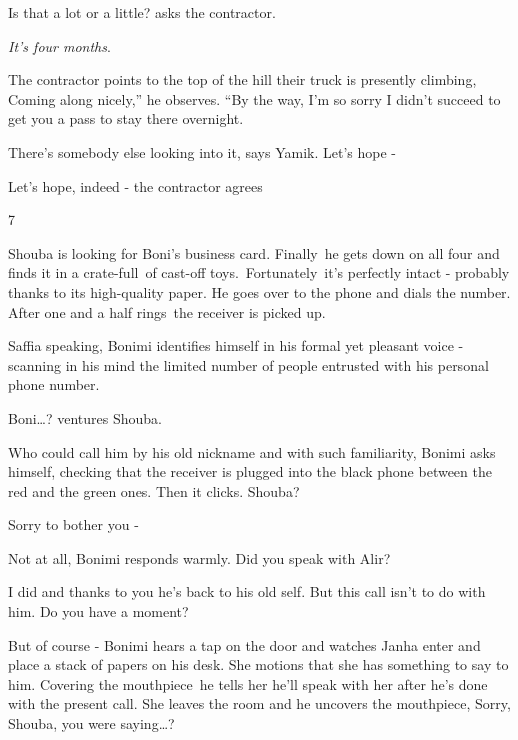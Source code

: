 \documentclass[letterpaper]{article}
\begin{document}
{\textquotedbl}Is that a lot or a little?{\textquotedbl} asks the contractor. 

{\textquotedbl}\textit{It's four months}.{\textquotedbl} 

The contractor points to the top of the hill their truck is presently climbing, {\textquotedbl}Coming along nicely,'' he
observes. ``By the way, I'm so sorry I didn't succeed to get you a pass to stay there overnight.{\textquotedbl} 

{\textquotedbl}There's somebody else looking into it,{\textquotedbl} says Yamik. {\textquotedbl}Let's hope
-{\textquotedbl} 

{\textquotedbl}Let's hope, indeed -{\textquotedbl} the contractor agrees


\bigskip

7\ \ 

Shouba is looking for Boni's business card. Finally\ he gets down on all four and finds it in a crate-full~of cast-off
toys.\ Fortunately\ it's perfectly intact -  probably thanks to its high-quality paper. He goes over to the phone and
dials the number. After one and a half rings~the receiver is picked up.

{\textquotedbl}Saffia speaking,{\textquotedbl} Bonimi identifies himself in his formal yet pleasant voice - scanning in
his mind the limited number of people entrusted with his personal phone number.

{\textquotedbl}Boni{\dots}?{\textquotedbl} ventures Shouba. 

Who could call him by his old nickname and with such familiarity, Bonimi asks himself, checking that the receiver is
plugged into the black phone between the red and the green ones. Then it clicks. {\textquotedbl}Shouba?{\textquotedbl} 

{\textquotedbl}Sorry to bother you -{\textquotedbl}\ 

{\textquotedbl}Not at all,{\textquotedbl} Bonimi responds warmly. {\textquotedbl}Did you speak with Alir?{\textquotedbl}

{\textquotedbl}I did and thanks to you he's back to his old self. But this call isn't to do with him. Do you have a
moment?{\textquotedbl}

{\textquotedbl}But of course -{\textquotedbl} Bonimi hears a tap on the door and watches Janha enter and place a stack
of papers on his desk. She motions that she has something to say to him. Covering the mouthpiece\ he tells her he'll
speak with her after he's done with the present call. She leaves the room and he uncovers the mouthpiece,
{\textquotedbl}Sorry, Shouba, you were saying{\dots}?{\textquotedbl}\ 
\end{document}
